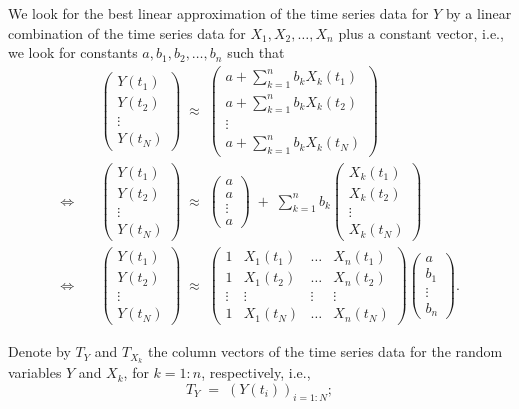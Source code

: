 We look for the best linear approximation of the time series data for $Y$ by a linear
combination of the time series data for $X_1, X_2, \ldots, X_n$ plus a constant
vector, i.e., we look for constants $a, b_1, b_2, \ldots, b_n$ such that
\begin{equation}
\begin{aligned}
&\begin{pmatrix} Y(t_1) \\ Y(t_2) \\ \vdots \\ Y(t_N) \end{pmatrix}
\;\approx\;
\begin{pmatrix} a + \sum_{k=1}^n b_kX_k(t_1) \\ a + \sum_{k=1}^n b_kX_k(t_2) \\ \vdots
\\ a + \sum_{k=1}^n b_kX_k(t_N) \end{pmatrix} \\
\Longleftrightarrow \quad
&\begin{pmatrix} Y(t_1) \\ Y(t_2) \\ \vdots \\ Y(t_N) \end{pmatrix}
\;\approx\;
\begin{pmatrix} a \\ a \\ \vdots \\ a \end{pmatrix}
\;+\; \sum_{k=1}^n b_k
\begin{pmatrix} X_k(t_1) \\ X_k(t_2) \\ \vdots \\ X_k(t_N) \end{pmatrix} \\
\Longleftrightarrow \quad
&\begin{pmatrix} Y(t_1) \\ Y(t_2) \\ \vdots \\ Y(t_N) \end{pmatrix}
\;\approx\;
\begin{pmatrix}
1 & X_1(t_1) & \dots & X_n(t_1) \\
1 & X_1(t_2) & \dots & X_n(t_2) \\
\vdots & \vdots & \vdots & \vdots \\
1 & X_1(t_N) & \dots & X_n(t_N)
\end{pmatrix}
\begin{pmatrix} a \\ b_1 \\ \vdots \\ b_n \end{pmatrix}.
\end{aligned}
\end{equation}

Denote by $T_Y$ and $T_{X_k}$ the column vectors of the time series data for the random
variables $Y$ and $X_k$, for $k = 1:n$, respectively, i.e.,
\begin{equation}
T_Y \;=\; (Y(t_i))_{i=1:N};
\end{equation}
